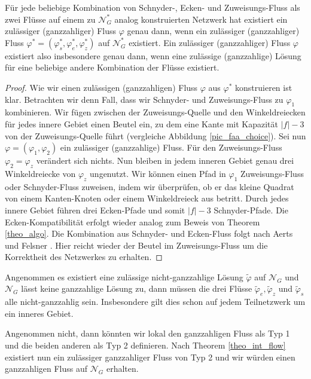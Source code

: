 \begin{proposition}\label{choose_types}
Für jede beliebige Kombination von Schnyder-, Ecken- und Zu\-weis\-ungs-Fluss als zwei Flüsse auf einem zu $\mathcal{N}^*_G$ analog konstruierten Netzwerk hat existiert ein zulässiger (ganzzahliger) Fluss $\varphi$ genau dann, wenn ein zulässiger (ganzzahliger) Fluss $\varphi^*=(\varphi^*_s,\varphi^*_e,\varphi^*_z)$ auf $\mathcal{N}^*_G$ existiert. Ein zulässiger (ganzzahliger) Fluss $\varphi$ existiert also insbesondere genau dann, wenn eine zulässige (ganzzahlige) Lösung für eine beliebige andere Kombination der Flüsse existiert.
\end{proposition}

\begin{proof}
Wie wir einen zulässigen (ganzzahligen) Fluss $\varphi$ aus $\varphi^*$ konstruieren ist klar. Betrachten wir denn Fall, dass wir Schnyder- und Zu\-weis\-ungs-Fluss zu $\varphi_1$ kombinieren. Wir fügen zwischen der Zuweisungs-Quelle und den Winkeldreiecken für jedes innere Gebiet einen Beutel ein, zu dem eine Kante mit Kapazität $|f|-3$ von der Zuweisungs-Quelle führt (vergleiche Abbildung \ref{pic_faa_choice}). Sei nun $\varphi=(\varphi_1,\varphi_2)$ ein zulässiger (ganzzahlige) Fluss. Für den Zuweisungs-Fluss $\varphi_2=\varphi_z$ verändert sich nichts. Nun bleiben in jedem inneren Gebiet genau drei Winkeldreiecke von $\varphi_z$ ungenutzt. Wir können einen Pfad in $\varphi_1$ Zuweisungs-Fluss oder Schnyder-Fluss zuweisen, indem wir überprüfen, ob er das kleine Quadrat von einem Kanten-Knoten oder einem Winkeldreieck aus betritt. Durch jedes innere Gebiet führen drei Ecken-Pfade und somit $|f|-3$ Schnyder-Pfade. Die Ecken-Kompatibilität erfolgt wieder analog zum Beweis von Theorem \ref{theo_algo}. Die Kombination aus Schnyder- und Ecken-Fluss folgt nach Aerts und Felsner \cite{af15}. Hier reicht wieder der Beutel im Zuweisungs-Fluss um die Korrektheit des Netzwerkes zu erhalten.
\end{proof}

\begin{claim}
Angenommen es existiert eine zulässige nicht-ganzzahlige Lösung $\tilde{\varphi}$ auf $\mathcal{N}_G$ und $\mathcal{N}_G$ lässt keine ganzzahlige Lösung zu, dann müssen die drei Flüsse $\tilde{\varphi}_e, \tilde{\varphi}_z$ und $\tilde{\varphi}_s$ alle nicht-ganzzahlig sein. Insbesondere gilt dies schon auf jedem Teilnetzwerk um ein inneres Gebiet.
\end{claim}

Angenommen nicht, dann könnten wir lokal den ganzzahligen Fluss als Typ 1 und die beiden anderen als Typ 2 definieren. Nach Theorem \ref{theo_int_flow} existiert nun ein zulässiger ganzzahliger Fluss von Typ 2 und wir würden einen ganzzahligen Fluss auf $\mathcal{N}_G$ erhalten. 

